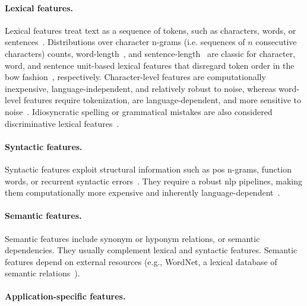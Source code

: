 \paragraph{Lexical features.} 
Lexical features treat text as a sequence of tokens, such as characters, words, or sentences~\citep{stamatatos_survey_2009}. 
Distributions over character n-grams (i.e. sequences of $n$ consecutive characters) counts, word-length~\citep{stein_intrinsic_2011}, and sentence-length~\citep{stein_intrinsic_2011,abbasi_writeprints_2008} are classic for character, word, and sentence unit-based lexical features that disregard token order in the \ac{bow} fashion~\citep{neal_surveying_2018}, respectively. 
Character-level features are computationally inexpensive, language-independent, and relatively robust to noise, whereas word-level features require tokenization, are language-dependent, and more sensitive to noise~\citep{stamatatos_survey_2009}.
Idiosyncratic spelling or grammatical mistakes are also considered discriminative lexical features~\citep{abbasi_writeprints_2008,neal_surveying_2018}. 

\paragraph{Syntactic features.}
Syntactic features exploit structural information such as \ac{pos} n-grams, function words, or recurrent syntactic errors~\citep{stamatatos_survey_2009,abbasi_writeprints_2008}.
They require a robust \ac{nlp} pipelines, making them computationally more expensive and inherently language-dependent~\citep{neal_surveying_2018,stamatatos_survey_2009}.

\paragraph{Semantic features.}
Semantic features include synonym or hyponym relations, or semantic dependencies. 
They usually complement lexical and syntactic features. 
Semantic features depend on external resources (e.g., WordNet, a lexical database of semantic relations~\citep{zhou_paraphrase_2025}).


\paragraph{Application-specific features.} %

